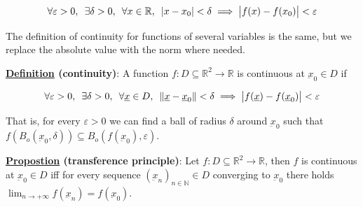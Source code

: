 \documentclass[10pt]{extarticle}
\newcommand{\R}{\mathbb{R}}
\newcommand{\N}{\mathbb{N}}
\newcommand{\munderbar}[1]{\underbar{\ensuremath{#1}}}
\begin{document}
$$
    \forall \varepsilon > 0, \enspace \exists \delta > 0, \enspace \forall x \in \R, \enspace \abs{x - x_0} < \delta \implies \abs{f(x) - f(x_0)} < \varepsilon
$$

The definition of continuity for functions of several variables is the same, but we replace the absolute value with the norm where needed.

\textbf{\underline{Definition} (continuity)}: A function $f: D \subseteq \R^2 \to \R$ is continuous at $\munderbar{x}_0 \in D$ if

$$
    \forall \varepsilon > 0, \enspace \exists \delta > 0, \enspace \forall \munderbar{x} \in D, \enspace \norm{\munderbar{x} - \munderbar{x}_0} < \delta \implies \abs{f(\munderbar{x}) - f(\munderbar{x}_0)} < \varepsilon
$$

That is, for every $\varepsilon > 0$ we can find a ball of radius $\delta$ around $\munderbar{x}_0$ such that $f(B_o(\munderbar{x}_0, \delta)) \subseteq B_o(f(\munderbar{x}_0), \varepsilon)$.

\textbf{\underline{Propostion} (transference principle)}:
Let $f: D \subseteq \R^2 \to \R$, then $f$ is continuous at $\munderbar{x}_0 \in D$ iff for every sequence $\left(\munderbar{x}_n\right)_{n \in \N} \in D$ converging to $\munderbar{x}_0$ there holds $\lim_{n \to +\infty} f(\munderbar{x}_n) = f(\munderbar{x}_0)$.
\end{document}
